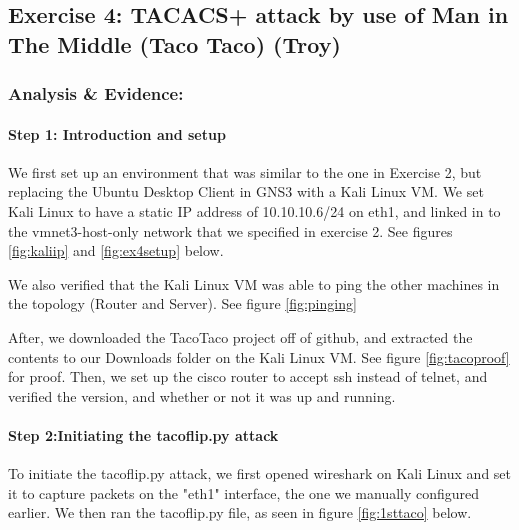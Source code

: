 \documentclass[main.tex]{subfiles}
\begin{document}
\subsection{Exercise 4: TACACS+ attack by use of Man in The Middle (Taco Taco) (Troy)}

\subsubsection{Analysis \& Evidence:}

\paragraph{Step 1: Introduction and setup}
\hfill \break

We first set up an environment that was similar to the one in Exercise 2, but replacing the Ubuntu Desktop Client in GNS3 with a Kali Linux VM. We set Kali Linux to have a static IP address of 10.10.10.6/24 on eth1, and linked in to the vmnet3-host-only network that we specified in exercise 2. See figures \ref{fig:kaliip} and \ref{fig:ex4setup} below.

We also verified that the Kali Linux VM was able to ping the other machines in the topology (Router and Server). See figure \ref{fig:pinging}

After, we downloaded the TacoTaco project off of github, and extracted the contents to our Downloads folder on the Kali Linux VM. See figure \ref{fig:tacoproof} for proof.
\hfill \break
{}
\hfill \break
{}
\hfill \break
{}
\hfill \break
{}
\hfill \break
Then, we set up the cisco router to accept ssh instead of telnet, and verified the version, and whether or not it was up and running.

\paragraph{Step 2:Initiating the tacoflip.py attack}
\hfill \break
To initiate the tacoflip.py attack, we first opened wireshark on Kali Linux and set it to capture packets on the "eth1" interface, the one we manually configured earlier. We then ran the tacoflip.py file, as seen in figure \ref{fig:1sttaco} below.
\end{document}

